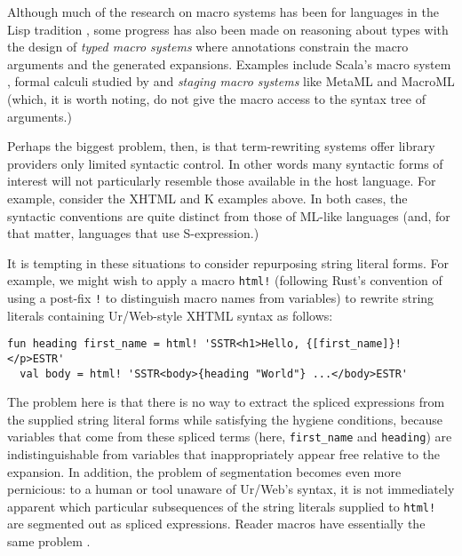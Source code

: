 \documentclass[acmsmall,10pt,review,anonymous]{acmart}\settopmatter{printfolios=true}
\newcommand{\li}[1]{\lstinline{#1}}
\begin{document}
Although much of the research on macro systems has been for languages in the Lisp tradition \cite{mccarthy1978history}, some progress has also been made on reasoning about types with the design of \emph{typed macro systems} where annotations constrain the macro arguments and the generated expansions. Examples include Scala's macro system \cite{ScalaMacros2013}, formal calculi studied by \citet{DBLP:conf/esop/HermanW08} and \emph{staging macro systems} like MetaML \cite{Sheard:1999:UMS} and MacroML \cite{ganz2001macros} (which, it is worth noting, do not give the macro access to the syntax tree of arguments.)

Perhaps the biggest problem, then, is that term-rewriting systems offer library providers only limited syntactic control. In other words many syntactic forms of interest will not particularly resemble those available in the host language. For example, consider the  XHTML and K examples above. In both cases, the syntactic conventions are quite distinct from those of ML-like languages (and, for that matter, languages that use S-expression.) 

It is tempting in these situations to consider repurposing string literal forms. For example, we might wish to apply a macro \li{html!} (following Rust's convention of using a post-fix \li{!} to distinguish macro names from variables) to rewrite string literals containing Ur/Web-style XHTML syntax as follows:
\begin{lstlisting}[numbers=none]
  fun heading first_name = html! 'SSTR<h1>Hello, {[first_name]}!</p>ESTR'
  val body = html! 'SSTR<body>{heading "World"} ...</body>ESTR'
\end{lstlisting}

The problem here is that there is no way to extract the spliced expressions from the supplied string literal forms while satisfying the hygiene conditions, because variables that come from these spliced terms (here, \li{first_name} and \li{heading}) are indistinguishable from variables that inappropriately appear free relative to the expansion. In addition, the problem of segmentation becomes even more pernicious: to a human or tool unaware of Ur/Web's syntax, it is not immediately apparent which particular subsequences of the string literals supplied to \li{html!} are segmented out as spliced expressions. Reader macros have essentially the same problem  \cite{DBLP:journals/jfp/FlattCDF12}.
\end{document}
